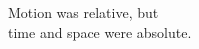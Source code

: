 \documentclass[preview]{standalone}
\begin{document}
\begin{center}
Motion was relative, but \\ time and space were absolute.
\end{center}
\end{document}

